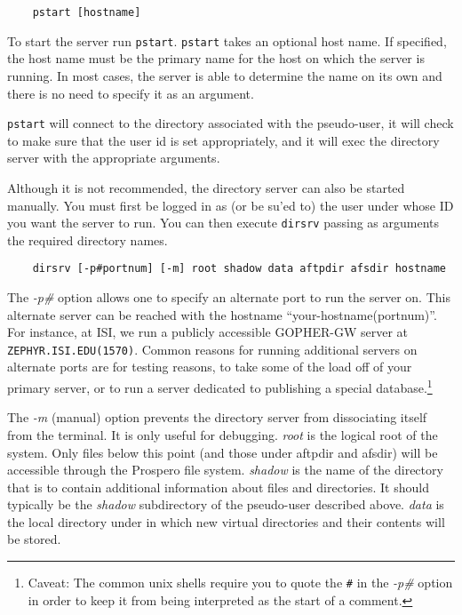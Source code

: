 \begin{verbatim}
    pstart [hostname]
\end{verbatim}

To start the server run {\tt pstart}.  {\tt pstart} takes an optional
host name.  If specified, the host name must be the primary name for
the host on which the server is running.  In most cases, the server is
able to determine the name on its own and there is no need to specify
it as an argument.

{\tt pstart} will connect to the directory associated with the
pseudo-user, it will check to make sure that the user id is set
appropriately, and it will exec the directory server with the
appropriate arguments.

Although it is not recommended, the directory server can also be
started manually.  You must first be logged in as (or be su'ed to) the
user under whose ID you want the server to run.  You can then execute
{\tt dirsrv} passing as arguments the required directory names.

\begin{verbatim}
    dirsrv [-p#portnum] [-m] root shadow data aftpdir afsdir hostname
\end{verbatim}
   
The {\em -p\#} option allows one to specify an alternate port to run 
the server on.  This alternate server can be reached with the hostname
``your-hostname(portnum)''.  For instance, at ISI, we run a publicly
accessible GOPHER-GW server at {\tt ZEPHYR.ISI.EDU(1570)}.  
Common reasons for running additional servers on alternate ports are
for testing reasons,  to take some of the load off of your primary
server, or to run a server dedicated to publishing a special
database.\footnote{Caveat: The common {\sc unix} shells require you to
quote the {\tt \#} in the {\em -p\#} option in order to keep it from
being interpreted as the start of a comment.}

The {\em -m} (manual) option prevents the directory server from
dissociating itself from the terminal.  It is only useful for
debugging.  {\em root} is the logical root of the system.  Only files
below this point (and those under aftpdir and afsdir) will be
accessible through the Prospero file system.  {\em shadow} is the name
of the directory that is to contain additional information about files
and directories.  It should typically be the {\it shadow} subdirectory
of the pseudo-user described above.  {\em data} is the local directory
under in which new virtual directories and their contents will be
stored.

